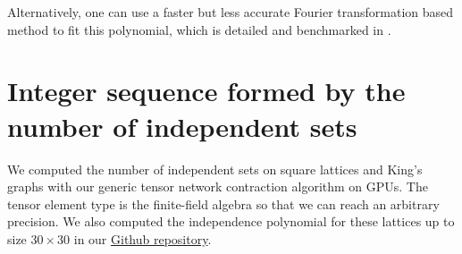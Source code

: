 \documentclass[review, onefignum, onetabnum]{siamart190516}
\begin{document}
Alternatively, one can use a faster but less accurate Fourier transformation based method to fit this polynomial, which is detailed and benchmarked in .

\section{Integer sequence formed by the number of independent sets}

We computed the number of independent sets on square lattices and King's graphs with our generic tensor network contraction algorithm on GPUs.
The tensor element type is the finite-field algebra so that we can reach an arbitrary precision.
We also computed the independence polynomial for these lattices up to size $30\times 30$ in our \href{https://github.com/GiggleLiu/NoteOnTropicalMIS/tree/master/data}{Github repository}.


\begin{table}[h]
\caption{The number of independent sets for square lattice graphs of size $L\times L$. This forms the integer sequence \href{https://oeis.org/A006506}{OEIS A006506}.
Here we only include two updated entries for $L=38,39$, which, to our knowledge, has not been computed before~\cite{Butera2014}.
}
\begin{center}
\end{center}
\label{tbl:squaregrid}
\end{table}
\end{document}
